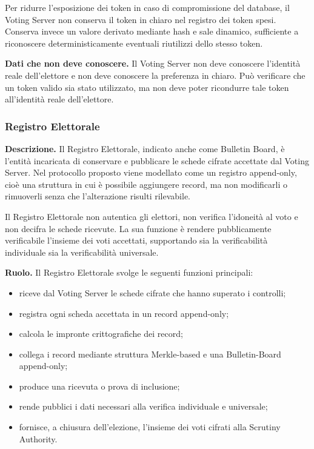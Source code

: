 \documentclass[a4paper,12pt]{article}
\begin{document}
Per ridurre l'esposizione dei token in caso di compromissione del database, il Voting Server non conserva il token in chiaro nel registro dei token spesi.
Conserva invece un valore derivato mediante hash e sale dinamico, sufficiente a riconoscere deterministicamente eventuali riutilizzi dello stesso token.

\textbf{Dati che non deve conoscere.}
Il Voting Server non deve conoscere l'identit\`a reale dell'elettore e non deve conoscere la preferenza in chiaro.
Pu\`o verificare che un token valido sia stato utilizzato, ma non deve poter ricondurre tale token all'identit\`a reale dell'elettore.

\subsubsection{Registro Elettorale}

\textbf{Descrizione.}
Il Registro Elettorale, indicato anche come Bulletin Board, \`e l'entit\`a incaricata di conservare e pubblicare le schede cifrate accettate dal Voting Server.
Nel protocollo proposto viene modellato come un registro append-only, cio\`e una struttura in cui \`e possibile aggiungere record, ma non modificarli o rimuoverli senza che l'alterazione risulti rilevabile.

Il Registro Elettorale non autentica gli elettori, non verifica l'idoneit\`a al voto e non decifra le schede ricevute.
La sua funzione \`e rendere pubblicamente verificabile l'insieme dei voti accettati, supportando sia la verificabilit\`a individuale sia la verificabilit\`a universale.

\textbf{Ruolo.}
Il Registro Elettorale svolge le seguenti funzioni principali:

\begin{itemize}
	\item riceve dal Voting Server le schede cifrate che hanno superato i controlli;
	\item registra ogni scheda accettata in un record append-only;
	\item calcola le impronte crittografiche dei record;
	\item collega i record mediante struttura Merkle-based e una Bulletin-Board append-only;
	\item produce una ricevuta o prova di inclusione;
	\item rende pubblici i dati necessari alla verifica individuale e universale;
	\item fornisce, a chiusura dell'elezione, l'insieme dei voti cifrati alla Scrutiny Authority.
\end{itemize}
\end{document}
